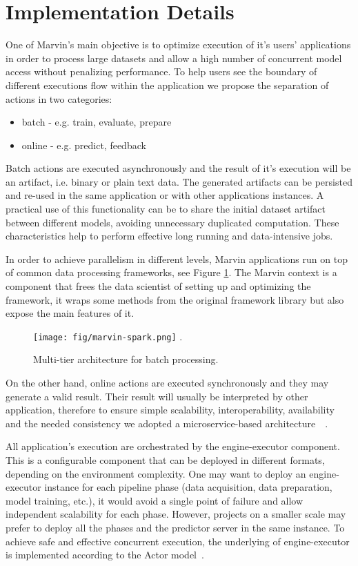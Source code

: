 \documentclass[twoside,11pt]{article}
\begin{document}
\section{Implementation Details}

One of Marvin's main objective is to optimize execution of it's users' applications in order to process large datasets and allow a high number of concurrent model access without penalizing performance. To help users see the boundary of different executions flow within the application we propose the separation of actions in two categories:
\begin{itemize}
    \item batch - e.g. train, evaluate, prepare
    \item online - e.g. predict, feedback
\end{itemize}

Batch actions are executed asynchronously and the result of it's execution will be an artifact, i.e. binary or plain text data. The generated artifacts can be persisted and re-used in the same application or with other applications instances. A practical use of this functionality can be to share the initial dataset artifact between different models, avoiding unnecessary duplicated computation. These characteristics help to perform effective long running and data-intensive jobs. 

In order to achieve parallelism in different levels, Marvin applications run on top of common data processing frameworks, see Figure \ref{fig_spark}. The Marvin context is a component that frees the data scientist of setting up and optimizing the framework, it wraps some methods from the original framework library but also expose the main features of it.
\begin{figure}[h]
\centering
\texttt{[image: fig/marvin-spark.png]}
\DeclareGraphicsExtensions.
\caption{Multi-tier architecture for batch processing.}
\label{fig_spark}
\end{figure}

On the other hand, online actions are executed synchronously and they may generate a valid result. Their result will usually be interpreted by other application, therefore to ensure simple scalability, interoperability, availability and the needed consistency we adopted a microservice-based architecture~\citep{brewer2000towards}~\citep{fowler2014microservices}. 

All application's execution are orchestrated by the engine-executor component. This is a configurable component that can be deployed in different formats, depending on the environment complexity. One may want to deploy an engine-executor instance for each pipeline phase (data acquisition, data preparation, model training, etc.), it would avoid a single point of failure and allow independent scalability for each phase. However, projects on a smaller scale may prefer to deploy all the phases and the predictor server in the same instance. To achieve safe and effective concurrent execution, the underlying of engine-executor is implemented according to the Actor model~\citep{hewitt1973session}.
\end{document}
